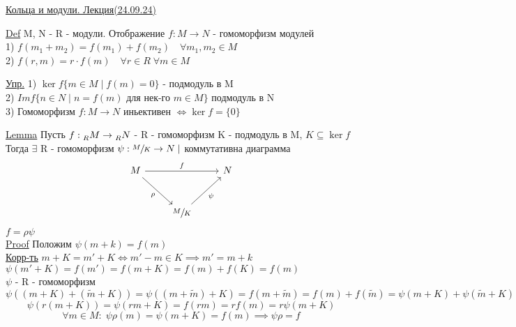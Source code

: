 \documentclass[a4paper]{article}
\begin{document}
\begin{center}
    \underline{Кольца и модули. Лекция(24.09.24)}
\end{center}

\underline{Def} M, N - R - модули. Отображение $ f: M \to N $ - гомоморфизм модулей \\
1) $ f(m_1 + m_2) = f(m_1) + f(m_2) \quad \forall m_1, m_2 \in M $ \\
2) $ f(r, m) = r \cdot f(m) \quad \forall r \in R \; \forall m \in M $ 

\underline{Упр.} 1) $ \ker f \{ m \in M \; |\; f(m) = 0 \} $ - подмодуль в M \\
2) $ Im f \{ n \in N \; | \; n = f(m) \text{ для нек-го } m \in M \} $ подмодуль в N\\ 
3) Гомоморфизм $ f: M \to N$ иньективен $ \iff \ker f = \{ 0 \} $ 

\begin{tcolorbox}
    \underline{Lemma} Пусть $ f: \prescript{}{R}{M} \to \prescript{}{R}{N} $ -
    R - гомоморфизм K - подмодуль в M, $ K \subseteq \ker f $ \\
    Тогда $ \exists $   R - гомоморфизм $ \psi : \sfrac{M}{K} \to N \; | $ коммутативна диаграмма 
    \[
    \begin{tikzcd}
        M \arrow{rr}{f} \arrow[swap]{dr}{\rho} & & N \\[10pt]
                               &\sfrac{M}{K} \arrow[swap]{ur}{\psi}
    \end{tikzcd}
    \]
    $ f = \rho \psi $ \\

    \underline{Proof} Положим $ \psi(m+k) = f(m) $ \\

    \underline{Корр-ть} $ m + K = m' + K \iff m' - m \in K \implies m' = m+k $\\
    $ \psi(m' + K) = f(m') = f(m + K) = f(m) + f(K) = f(m) $ \\

    $ \psi $ - R - гомоморфизм
    \[
        \psi\left( (m + K) + (\tilde{m} + K)\right) = \psi((m + \tilde{m}) + K) =
        f(m + \tilde{m}) = f(m) + f(\tilde{m}) = \psi(m + K) + \psi(\tilde{m} + K)
    \]
    \[
        \psi(r(m + K)) = \psi(rm + K) = f(rm) = r f(m) = r \psi(m + K)
    \]
    \[
        \forall m \in M: \; \psi \rho(m) = \psi(m + K) = f(m) \implies \psi\rho = f
    \]
\end{tcolorbox}
\end{document}
